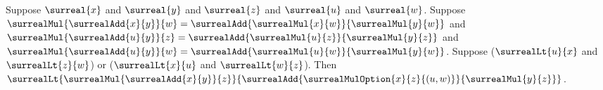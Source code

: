 \begin{lemma}\label{surreal_distributive_option_lt_mixed}
    Suppose $\surreal{x}$ and $\surreal{y}$ and $\surreal{z}$ and
        $\surreal{u}$ and $\surreal{w}$.
    Suppose
        $\surrealMul{\surrealAdd{x}{y}}{w}
            =\surrealAdd{\surrealMul{x}{w}}{\surrealMul{y}{w}}$ and
        $\surrealMul{\surrealAdd{u}{y}}{z}
            =\surrealAdd{\surrealMul{u}{z}}{\surrealMul{y}{z}}$ and
        $\surrealMul{\surrealAdd{u}{y}}{w}
            =\surrealAdd{\surrealMul{u}{w}}{\surrealMul{y}{w}}$.
    Suppose
        ($\surrealLt{u}{x}$ and $\surrealLt{z}{w}$) or
        ($\surrealLt{x}{u}$ and $\surrealLt{w}{z}$).
    Then
        $\surrealLt
            {\surrealMul{\surrealAdd{x}{y}}{z}}
            {\surrealAdd{\surrealMulOption{x}{z}{(u,w)}}
                {\surrealMul{y}{z}}}$.
\end{lemma}
